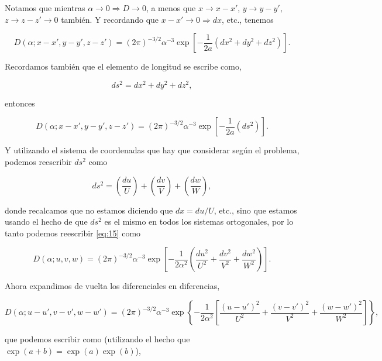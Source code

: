 \documentclass[a4paper,11pt]{article}
\numberwithin{equation}{section}
\begin{document}
Notamos que mientras $\alpha \rightarrow 0 \Rightarrow D \rightarrow 0$, a 
menos que  $x \rightarrow x-x'$, $y \rightarrow y-y'$, $z \rightarrow z-z' 
\rightarrow 0$ también. Y recordando que $x-x' \rightarrow 0 \Rightarrow dx$, etc., 
tenemos 

\begin{equation}
 D(\alpha;x-x',y-y',z-z') = (2\pi)^{-3/2}\alpha^{-3}
 \exp\left[-\frac{1}{2a}(dx^2 + dy^2 + dz^2) \right].
\end{equation}

Recordamos también que el elemento de longitud se escribe como, 

\begin{equation}
 ds^2 = dx^2 + dy^2 + dz^2,
\end{equation}

entonces 

\begin{equation}
 D(\alpha;x-x',y-y',z-z') = (2\pi)^{-3/2}\alpha^{-3}
 \exp\left[-\frac{1}{2a}(ds^2) \right].
 \label{eq:15}
\end{equation}

Y utilizando el sistema de coordenadas que hay que considerar según el problema, 
podemos reescribir $ds^2$ como 

\begin{equation}
 ds^2 = \left(\frac{du}{U}\right) + \left(\frac{dv}{V}\right) + 
 \left(\frac{dw}{W}\right),
\end{equation}

donde recalcamos que no estamos diciendo que $dx = du/U$, etc., sino que estamos 
usando el hecho de que $ds^2$ es el mismo en todos los sistemas ortogonales, 
por lo tanto podemos reescribir \eqref{eq:15} como 

\begin{equation}
 D(\alpha;u,v,w) = (2\pi)^{-3/2}\alpha^{-3}
 \exp\left[-\frac{1}{2\alpha^2}\left(\frac{du^2}{U^2} + 
 \frac{dv^2}{V^2} + \frac{dw^2}{W^2}\right) \right].
\end{equation}

Ahora expandimos de vuelta los diferenciales en diferencias, 

\begin{equation*}
 D(\alpha;u-u',v-v',w-w') = (2\pi)^{-3/2}\alpha^{-3}
 \exp\left\{-\frac{1}{2\alpha^2}\left[\frac{(u - u')^2}{U^2} + 
 \frac{(v-v')^2}{V^2} + \frac{(w-w')^2}{W^2}\right] \right\},
\end{equation*}

que podemos escribir como (utilizando el hecho que $\exp(a+b) = \exp(a)\exp(b)$),
\end{document}

